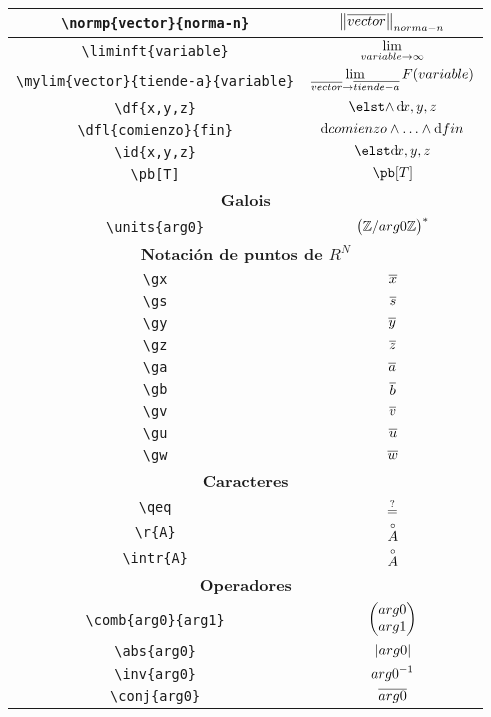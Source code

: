 \begin{longtable}{|c|c|}
\verb|\normp{vector}{norma-n}| & $\displaystyle\norm{\overline{vector}}_{norma-n}$ \\ \hline 
\verb|\liminft{variable}| & $\displaystyle\lim_{{variable}\rightarrow \infty}$ \\ \hline 
\verb|\mylim{vector}{tiende-a}{variable}| & $\displaystyle\lim_{\overline{vector} \rightarrow \overline{tiende-a}} F({variable})$ \\ \hline 
\verb|\df{x,y,z}| & $\displaystyle\df{x,y,z}$ \\ \hline 
\verb|\dfl{comienzo}{fin}| & $\displaystyle\dfl{comienzo}{fin}$ \\ \hline 
\verb|\id{x,y,z}| & $\displaystyle\id{x,y,z}$ \\ \hline 
\verb|\pb[T]| & $\displaystyle\pb[T]$ \\ \hline 
\multicolumn{2}{|c|}{\textbf{Galois}} \\ \hline 
\verb|\units{arg0}| & $\displaystyle\left(\mathbb{Z}/{arg0}\mathbb{Z}\right)^*$ \\ \hline 
\multicolumn{2}{|c|}{\textbf{Notación de puntos de $R^N$}} \\ \hline 
\verb|\gx| & $\displaystyle\overline{x}$ \\ \hline 
\verb|\gs| & $\displaystyle\overline{s}$ \\ \hline 
\verb|\gy| & $\displaystyle\overline{y}$ \\ \hline 
\verb|\gz| & $\displaystyle\overline{z}$ \\ \hline 
\verb|\ga| & $\displaystyle\overline{a}$ \\ \hline 
\verb|\gb| & $\displaystyle\overline{b}$ \\ \hline 
\verb|\gv| & $\displaystyle\overline{v}$ \\ \hline 
\verb|\gu| & $\displaystyle\overline{u}$ \\ \hline 
\verb|\gw| & $\displaystyle\overline{w}$ \\ \hline 
\multicolumn{2}{|c|}{\textbf{Caracteres}} \\ \hline 
\verb|\qeq| & $\displaystyle\overset{?}{=}$ \\ \hline 
\verb|\r{A}| & $\displaystyle\overset{\circ}{A}$ \\ \hline 
\verb|\intr{A}| & $\displaystyle\overset{\circ}{A}$ \\ \hline 
\multicolumn{2}{|c|}{\textbf{Operadores}} \\ \hline 
\verb|\comb{arg0}{arg1}| & $\displaystyle\left( \begin{matrix} arg0 \\ arg1 \end{matrix} \right)$ \\ \hline 
\verb|\abs{arg0}| & $\displaystyle\left\vert arg0 \right\vert$ \\ \hline 
\verb|\inv{arg0}| & $\displaystyle{arg0}^{-1}$ \\ \hline 
\verb|\conj{arg0}| & $\displaystyle\overline{arg0}$ \\ \hline 

\end{longtable}
